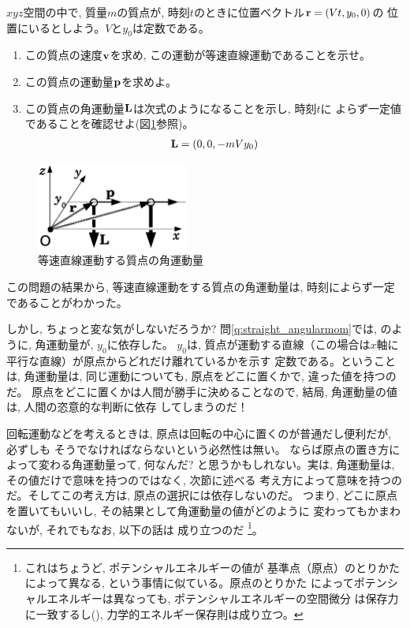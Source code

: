 %
\begin{q}\label{q:straight_angularmom}
$xyz$空間の中で, 質量$m$の質点が, 時刻$t$のときに位置ベクトル${\bf r}=(Vt, y_0, 0)$の
位置にいるとしよう。$V$と$y_0$は定数である。
\begin{enumerate}
\item この質点の速度${\bf v}$を求め, この運動が等速直線運動であることを示せ。
\item この質点の運動量${\bf p}$を求めよ。
\item この質点の角運動量${\bf L}$は次式のようになることを示し, 時刻$t$に
よらず一定値であることを確認せよ(図\ref{fig:angular_mom_lin}参照)。
\begin{eqnarray}
{\bf L}=(0, 0, -mVy_0)\label{eq:straight_angularmom}
\end{eqnarray}
\end{enumerate}
\begin{figure}[h]
    \centering
    \includegraphics[width=5cm]{angular_mom_lin.eps}
    \caption{等速直線運動する質点の角運動量}\label{fig:angular_mom_lin}
\end{figure}
\end{q}

この問題の結果から, 等速直線運動をする質点の角運動量は, 時刻によらず一定
であることがわかった。

しかし, ちょっと変な気がしないだろうか? 問\ref{q:straight_angularmom}では, 
のように, 角運動量が, $y_0$に依存した。
$y_0$は, 質点が運動する直線（この場合は$x$軸に平行な直線）が原点からどれだけ離れているかを示す
定数である。ということは, 角運動量は, 同じ運動についても, 原点をどこに置くかで, 違った値を持つのだ。
原点をどこに置くかは人間が勝手に決めることなので, 結局, 角運動量の値は, 人間の恣意的な判断に依存
してしまうのだ！

回転運動などを考えるときは, 原点は回転の中心に置くのが普通だし便利だが, 必ずしも
そうでなければならないという必然性は無い。
ならば原点の置き方によって変わる角運動量って, 何なんだ? 
と思うかもしれない。実は, 角運動量は, その値だけで意味を持つのではなく, 次節に述べる
考え方によって意味を持つのだ。そしてこの考え方は, 原点の選択には依存しないのだ。
つまり, どこに原点を置いてもいいし, その結果として角運動量の値がどのように
変わってもかまわないが, それでもなお, 以下の話は
成り立つのだ
\footnote{これはちょうど, ポテンシャルエネルギーの値が
基準点（原点）のとりかたによって異なる, という事情に似ている。原点のとりかた
によってポテンシャルエネルギーは異なっても, ポテンシャルエネルギーの空間微分
は保存力に一致するし(), 力学的エネルギー保存則は成り立つ。}。
\hv


